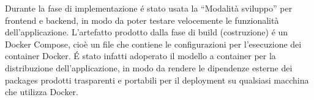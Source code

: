 Durante la fase di implementazione é stato usata la ``Modalità sviluppo'' per frontend e backend, in modo da poter testare velocemente le funzionalità dell'applicazione. L'artefatto prodotto dalla fase di build (costruzione) é un Docker Compose, cioè un file che contiene le configurazioni per l'esecuzione dei container Docker. É stato infatti adoperato il modello a container per la distribuzione dell'applicazione, in modo da rendere le dipendenze esterne dei packages prodotti trasparenti e portabili per il deployment su qualsiasi macchina che utilizza Docker.\\